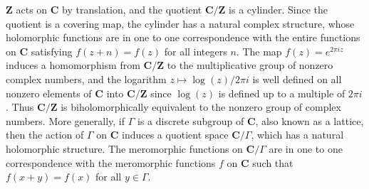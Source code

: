 \begin{example}
    $\mathbf{Z}$ acts on $\mathbf{C}$ by translation, and the quotient $\mathbf{C}/\mathbf{Z}$ is a cylinder. Since the quotient is a covering map, the cylinder has a natural complex structure, whose holomorphic functions are in one to one correspondence with the entire functions on $\mathbf{C}$ satisfying $f(z + n) = f(z)$ for all integers $n$. The map $f(z) = e^{2 \pi i z}$ induces a homomorphism from $\mathbf{C}/\mathbf{Z}$ to the multiplicative group of nonzero complex numbers, and the logarithm $z \mapsto \log(z)/2\pi i$ is well defined on all nonzero elements of $\mathbf{C}$ into $\mathbf{C}/\mathbf{Z}$ since $\log(z)$ is defined up to a multiple of $2 \pi i$. Thus $\mathbf{C}/\mathbf{Z}$ is biholomorphically equivalent to the nonzero group of complex numbers. More generally, if $\Gamma$ is a discrete subgroup of $\mathbf{C}$, also known as a lattice, then the action of $\Gamma$ on $\mathbf{C}$ induces a quotient space $\mathbf{C}/\Gamma$, which has a natural holomorphic structure. The meromorphic functions on $\mathbf{C}/\Gamma$ are in one to one correspondence with the meromorphic functions $f$ on $\mathbf{C}$ such that $f(x + y) = f(x)$ for all $y \in \Gamma$.
\end{example}

